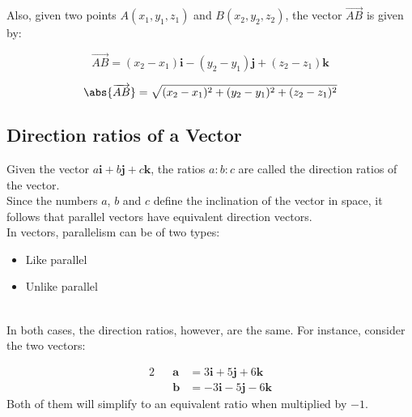 \documentclass{standalone}
\begin{document}
	Also, given two points $A(x_1,y_1,z_1)$ and $B(x_2,y_2,z_2)$, the vector $\overrightarrow{AB}$ is given by:
	\begin{center}
		\begin{tcolorbox}[center title,hbox,    %
			lifted shadow={1mm}{-2mm}{3mm}{0.1mm}%
			{black!50!white}]
			\begin{varwidth}{\textwidth}
				\begin{center}
					$$\overrightarrow{AB} = (x_2 -x_1)\textbf{i} - (y_2 -y_1)\textbf{j} + (z_2 - z_1)\textbf{k}$$
					
					$$	\abs{\overrightarrow{AB}} = \sqrt{(x_2 -x_1)^2 + (y_2 -y_1)^2 + (z_2 - z_1)^2}$$
				\end{center}
			\end{varwidth}
		\end{tcolorbox} 
	\end{center}
	
	\subsection{Direction ratios of a Vector}
	
	Given the vector $a\textbf{i}+b\textbf{j}+c\textbf{k}$, the ratios $a\colon b\colon c$ are called the direction ratios of the vector.\\
	
	Since the numbers $a$, $b$ and $c$ define the inclination of the vector in space, it follows that parallel vectors have equivalent direction vectors.\\
	
	In vectors, parallelism can be of two types:\\
	\begin{itemize}
		\item{Like parallel}
		\item{Unlike parallel}
	\end{itemize}
	~\\
	In both cases, the direction ratios, however, are the same. For instance, consider the two vectors:
	
	\begin{alignat*}{2}
		&   & \textbf{a} & = 3\textbf{i} + 5\textbf{j} + 6\textbf{k}  \\
		&   & \textbf{b} & = -3\textbf{i} -5\textbf{j}  - 6\textbf{k} 
	\end{alignat*}
	Both of them will simplify to an equivalent ratio when multiplied by $-1$.
	
\end{document}
